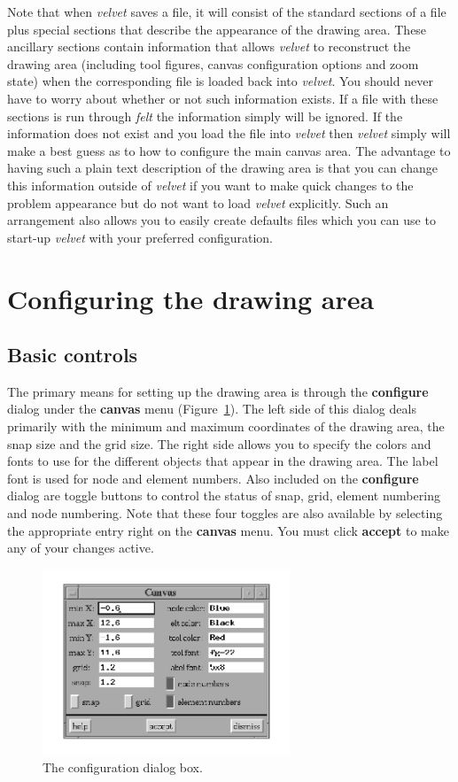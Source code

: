 Note that when {\em velvet} saves a file, it will consist of the standard
sections of a \felt{} file plus special sections that describe the appearance
of the drawing area.  These ancillary sections contain information
that allows {\em velvet} to reconstruct the drawing area (including tool
figures, canvas configuration options and zoom state) when the corresponding
\felt{} file is loaded 
back into {\em velvet}.  You should never have to worry about whether or not
such information exists.  If a file with these sections is run through
{\em felt} the information simply will be ignored.  If the information 
does not exist
and you load the file into {\em velvet} then {\em velvet} simply will make
a best guess as to how to configure the main canvas area.  The advantage to
having such a plain text description of the drawing area is that you can change
this information outside of {\em velvet} if you want to make quick changes to 
the problem appearance but do not want to load {\em velvet} explicitly.  Such
an arrangement also allows you to easily create defaults files which you
can use to start-up {\em velvet} with your preferred configuration.

\section{Configuring the drawing area}
\subsection{Basic controls}

The primary means for setting up the drawing area is through the 
{\bf configure} dialog under the {\bf canvas} menu 
(Figure~\ref{velvet.configure}).  The left side of this dialog deals primarily 
with the minimum and maximum coordinates of the drawing area, the snap size 
and the grid size.  The right side allows you to specify the colors and fonts 
to use for the different objects that appear in the drawing area.
The label font is used for node and element numbers. 
Also included on the {\bf configure} dialog are toggle buttons to control
the status of snap, grid, element numbering and node numbering.
Note that these four toggles are also available by selecting the appropriate 
entry right on the {\bf canvas} menu.  You must click {\bf accept} to
make any of your changes active.   

\begin{figure}
\begin{center}
 \includegraphics[width=2.91in]{figures/velvet_configure}
\end{center}
\caption{The configuration dialog box.}
\label{velvet.configure}
\end{figure}

